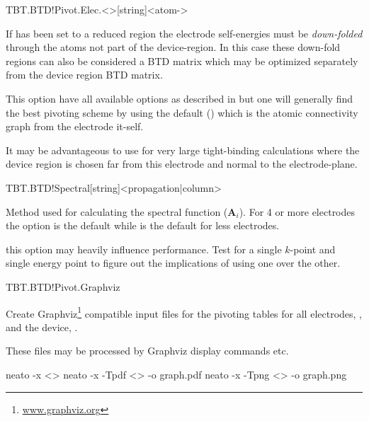 \begin{fdfentry}{TBT.BTD!Pivot.Elec.<>}[string]<atom-\nonvalue{<>}>

  If  has been set to a reduced region the
  electrode self-energies must be \emph{down-folded} through the atoms
  not part of the device-region. In this case these down-fold regions
  can also be considered a BTD matrix which may be optimized
  separately from the device region BTD matrix.

  This option have all available options as described in
   but one will generally find the best
  pivoting scheme by using the default () which is the
  atomic connectivity graph from the electrode it-self.

  It may be advantageous to use  for very large
  tight-binding calculations where the device region is chosen far
  from this electrode and normal to the electrode-plane. 

\end{fdfentry}

\begin{fdfentry}{TBT.BTD!Spectral}[string]<propagation|column>

  Method used for calculating the spectral function ($\mathbf A_i$).
  For 4 or more electrodes the  option is the default
  while  is the default for less electrodes.

  \note this option may heavily influence performance. Test for a
  single $k$-point and single energy point to figure out the
  implications of using one over the other.
  
\end{fdfentry}

\begin{fdflogicalF}{TBT.BTD!Pivot.Graphviz}

  Create Graphviz\footnote{\url{www.graphviz.org}} compatible input
  files for the pivoting tables for all electrodes,
  , and the device, .

  These files may be processed by Graphviz display commands
   etc.

  \begin{shellexample}
    neato -x <>
    neato -x -Tpdf <> -o graph.pdf
    neato -x -Tpng <> -o graph.png
  \end{shellexample}
  
\end{fdflogicalF}


